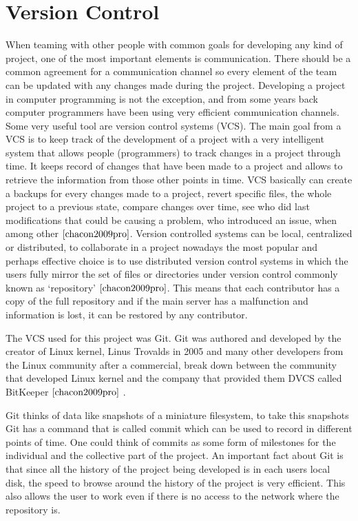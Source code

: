 \section{Version Control}
When teaming with other people with common goals for developing any kind of project, one of the most important elements is communication. There should be a common agreement for a communication channel so every element of the team can be updated with any changes made during the project. 
Developing a project in computer programming is not the exception, and from some years back computer programmers have been using very efficient communication channels. Some very  useful tool are version control systems (VCS). The main goal from a VCS is to keep track of the development of a project with a very intelligent system that allows people (programmers) to track changes in a project through time. It keeps record of changes that have been made to a project and allows to retrieve the information from those other points in time. VCS basically can create a backups for every changes made to a project, revert specific files, the whole project to a previous state, compare changes over time, see who did last modifications that could be causing a problem, who introduced an issue, when among other $\cite{chacon2009pro}$. Version controlled systems can be local, centralized or distributed, to collaborate in a project nowadays the most popular and perhaps effective choice is to use distributed version control systems in which the users fully mirror the set of files or directories under version control commonly known as `repository' $\cite{chacon2009pro}$. This means that each contributor has a copy of the full repository and if the main server has a malfunction and information is lost, it can be restored by any contributor. 

The VCS used for this project was Git. Git was authored and developed by the creator of Linux kernel, Linus Trovalds in 2005 and many other developers from the Linux community after a commercial, break down between the community that developed Linux kernel and the company that provided them DVCS called BitKeeper $\cite{chacon2009pro}$ . 

Git thinks of data like snapshots of a miniature filesystem, to take this snapshots Git has a command that is called commit which can be used to record in different points of time. One could think of commits as some form of milestones for the individual and the collective part of the project. An important fact about Git is that since all the history of the project being developed is in each users local disk, the speed to browse around the history of the project is very efficient. This also allows the user to work even if there is no access to the network where the repository is. 

